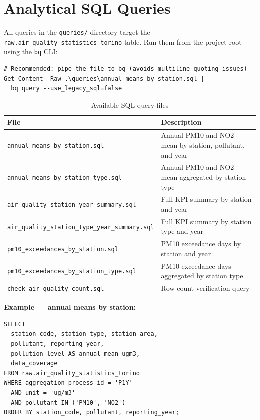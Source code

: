 \documentclass[11pt,a4paper]{article}
\begin{document}
\section{Analytical SQL Queries}

All queries in the \texttt{queries/} directory target the
\texttt{raw.air\_quality\_statistics\_torino} table.
Run them from the project root using the \texttt{bq} CLI:

\begin{lstlisting}[style=shell]
# Recommended: pipe the file to bq (avoids multiline quoting issues)
Get-Content -Raw .\queries\annual_means_by_station.sql |
  bq query --use_legacy_sql=false
\end{lstlisting}

\begin{table}[h!]
\centering
\caption{Available SQL query files}
\small
\begin{tabularx}{\textwidth}{@{}lX@{}}
\toprule
\textbf{File} & \textbf{Description} \\
\midrule
\texttt{annual\_means\_by\_station.sql}             & Annual PM10 and NO2 mean by station, pollutant, and year \\
\texttt{annual\_means\_by\_station\_type.sql}       & Annual PM10 and NO2 mean aggregated by station type \\
\texttt{air\_quality\_station\_year\_summary.sql}   & Full KPI summary by station and year \\
\texttt{air\_quality\_station\_type\_year\_summary.sql} & Full KPI summary by station type and year \\
\texttt{pm10\_exceedances\_by\_station.sql}         & PM10 exceedance days by station and year \\
\texttt{pm10\_exceedances\_by\_station\_type.sql}   & PM10 exceedance days aggregated by station type \\
\texttt{check\_air\_quality\_count.sql}             & Row count verification query \\
\bottomrule
\end{tabularx}
\end{table}

\textbf{Example — annual means by station:}

\begin{lstlisting}[style=sql]
SELECT
  station_code, station_type, station_area,
  pollutant, reporting_year,
  pollution_level AS annual_mean_ugm3,
  data_coverage
FROM raw.air_quality_statistics_torino
WHERE aggregation_process_id = 'P1Y'
  AND unit = 'ug/m3'
  AND pollutant IN ('PM10', 'NO2')
ORDER BY station_code, pollutant, reporting_year;
\end{lstlisting}
\end{document}
